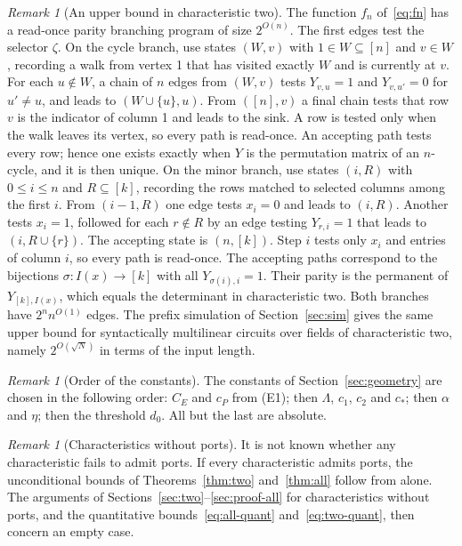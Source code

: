 \documentclass[11pt]{article}
\theoremstyle{remark}
\newtheorem{remark}[theorem]{Remark}
\begin{document}
\begin{remark}[An upper bound in characteristic two]
The function \(f_n\) of~\eqref{eq:fn} has a read-once parity
branching program of size \(2^{O(n)}\). The first edges test the
selector \(\zeta\). On the cycle branch, use states \((W,v)\) with
\(1\in W\subseteq[n]\) and \(v\in W\), recording a walk from vertex 1
that has visited exactly \(W\) and is currently at \(v\). For each
\(u\notin W\), a chain of \(n\) edges from \((W,v)\) tests \(Y_{v,u}=1\)
and \(Y_{v,u'}=0\) for \(u'\ne u\), and leads to \((W\cup\{u\},u)\). From
\(([n],v)\) a final chain tests that row \(v\) is the indicator of column
1 and leads to the sink. A row is tested only when the walk leaves its
vertex, so every path is read-once. An accepting path tests every row;
hence one exists exactly when \(Y\) is the permutation matrix of an
\(n\)-cycle, and it is then unique. On the minor branch, use states
\((i,R)\) with \(0\le i\le n\) and \(R\subseteq[k]\), recording the rows
matched to selected columns among the first \(i\). From \((i-1,R)\) one
edge tests \(x_i=0\) and leads to \((i,R)\). Another tests \(x_i=1\),
followed for each \(r\notin R\) by an edge testing \(Y_{r,i}=1\) that
leads to \((i,R\cup\{r\})\). The accepting state is \((n,[k])\). Step
\(i\) tests only \(x_i\) and entries of column \(i\), so every path is
read-once. The accepting paths correspond to the bijections
\(\sigma:I(x)\to[k]\) with all \(Y_{\sigma(i),i}=1\). Their parity is the
permanent of \(Y_{[k],I(x)}\), which equals the determinant in
characteristic two. Both branches have \(2^{n}n^{O(1)}\) edges. The prefix
simulation of Section~\ref{sec:sim} gives the same upper bound for
syntactically multilinear circuits over fields of characteristic two, namely
\(2^{O(\sqrt N)}\) in terms of the input length.
\end{remark}

\begin{remark}[Order of the constants]
The constants of Section~\ref{sec:geometry} are chosen in the following
order: \(C_E\) and \(c_P\) from (E1); then \(\Lambda\), \(c_1\), \(c_2\)
and \(c_*\); then \(\alpha\) and \(\eta\); then the threshold \(d_0\).
All but the last are absolute.
\end{remark}

\begin{remark}[Characteristics without ports]
It is not known whether any characteristic fails to admit ports. If
every characteristic admits ports, the unconditional bounds of
Theorems~\ref{thm:two} and~\ref{thm:all} follow from
\cite[Theorem 12.2]{hc} alone. The arguments of
Sections~\ref{sec:two}--\ref{sec:proof-all} for characteristics without
ports, and the quantitative bounds~\eqref{eq:all-quant}
and~\eqref{eq:two-quant}, then concern an empty case.
\end{remark}
\end{document}
